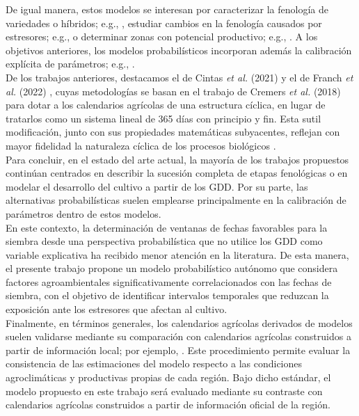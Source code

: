 De igual manera, estos modelos se interesan por caracterizar la fenología de variedades o híbridos; e.g., \cite{Felema_2024}, estudiar cambios en la fenología causados por estresores; e.g., \cite{Ceglar2011,Ogutu_2018} o determinar zonas con potencial productivo; e.g., \cite{Tonnang_2018}. A los objetivos anteriores, los modelos probabilísticos incorporan además la calibración explícita de parámetros; e.g., \cite{Ceglar2011,Tonnang_2018,Viswanathan2022, Viswanathan_2022}.\\

De los trabajos anteriores, destacamos el de Cintas \textit{et al.} (2021) \cite{Cintas_2021} y el de Franch \textit{et al.} (2022) \cite{Franch_2022}, cuyas metodologías se basan en el trabajo de Cremers \textit{et al.} (2018) \cite{Cremers_2018} para dotar a los calendarios agrícolas de una estructura cíclica, en lugar de tratarlos como un sistema lineal de 365 días con principio y fin. Esta sutil modificación, junto con sus propiedades matemáticas subyacentes, reflejan con mayor fidelidad la naturaleza cíclica de los procesos biológicos \cite{Chuine_2017,Gatto_2015,Gurney_1992,Mardia1999,Powell_2005,Regniere_2013}.\\


Para concluir, en el estado del arte actual, la mayoría de los trabajos propuestos continúan centrados en describir la sucesión completa de etapas fenológicas o en modelar el desarrollo del cultivo a partir de los GDD. Por su parte, las alternativas probabilísticas suelen emplearse principalmente en la calibración de parámetros dentro de estos modelos.\\

En este contexto, la determinación de ventanas de fechas favorables para la siembra desde una perspectiva probabilística que no utilice los GDD como variable explicativa ha recibido menor atención en la literatura. De esta manera, el presente trabajo propone un modelo probabilístico autónomo que considera factores agroambientales significativamente correlacionados con las fechas de siembra, con el objetivo de identificar intervalos temporales que reduzcan la exposición ante los estresores que afectan al cultivo.\\

Finalmente, en términos generales, los calendarios agrícolas derivados de modelos suelen validarse mediante su comparación con calendarios agrícolas construidos a partir de información local; por ejemplo, \cite{Portmann_2010, Sacks_2010}. Este procedimiento permite evaluar la consistencia de las estimaciones del modelo respecto a las condiciones agroclimáticas y productivas propias de cada región. Bajo dicho estándar, el modelo propuesto en este trabajo será evaluado mediante su contraste con calendarios agrícolas construidos a partir de información oficial de la región.\\



